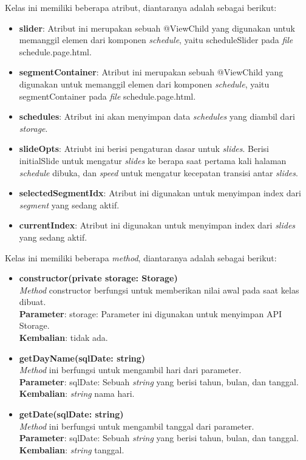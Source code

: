 \begin{enumerate}
			Kelas ini memiliki beberapa atribut, diantaranya adalah sebagai berikut:
			\begin{itemize} 
				\item \textbf{slider}: Atribut ini merupakan sebuah @ViewChild yang digunakan untuk memanggil elemen dari komponen \textit{schedule}, yaitu scheduleSlider pada \textit{file} schedule.page.html.
				\item \textbf{segmentContainer}: Atribut ini merupakan sebuah @ViewChild yang digunakan untuk memanggil elemen dari komponen \textit{schedule}, yaitu segmentContainer pada \textit{file} schedule.page.html.
				\item \textbf{schedules}: Atribut ini akan menyimpan data \textit{schedules} yang diambil dari \textit{storage}.
				\item \textbf{slideOpts}: Atriubt ini berisi pengaturan dasar untuk \textit{slides}. Berisi initialSlide untuk mengatur \textit{slides} ke berapa saat pertama kali halaman \textit{schedule} dibuka, dan \textit{speed} untuk mengatur kecepatan transisi antar \textit{slides}.
				\item \textbf{selectedSegmentIdx}: Atribut ini digunakan untuk menyimpan index dari \textit{segment} yang sedang aktif.
				\item \textbf{currentIndex}: Atribut ini digunakan untuk menyimpan index dari \textit{slides} yang sedang aktif.
			\end{itemize}
			Kelas ini memiliki beberapa \textit{method}, diantaranya adalah sebagai berikut:
			\begin{itemize}
				\item \textbf{constructor(private storage: Storage)}\\ 
					\textit{Method} constructor berfungsi untuk memberikan nilai awal pada saat kelas dibuat. \\
					\textbf{Parameter}: storage: Parameter ini digunakan untuk menyimpan API Storage.\\
					\textbf{Kembalian}: tidak ada.
					\newpage
				\item \textbf{getDayName(sqlDate: string)}\\
					\textit{Method} ini berfungsi untuk mengambil hari dari parameter. \\
					\textbf{Parameter}: sqlDate: Sebuah \textit{string} yang berisi tahun, bulan, dan tanggal.\\
					\textbf{Kembalian}: \textit{string} nama hari.
				
				\item \textbf{getDate(sqlDate: string)}\\
					\textit{Method} ini berfungsi untuk mengambil tanggal dari parameter. \\
					\textbf{Parameter}: sqlDate: Sebuah \textit{string} yang berisi tahun, bulan, dan tanggal. \\
					\textbf{Kembalian}: \textit{string} tanggal.
					

\end{itemize}
\end{enumerate}
